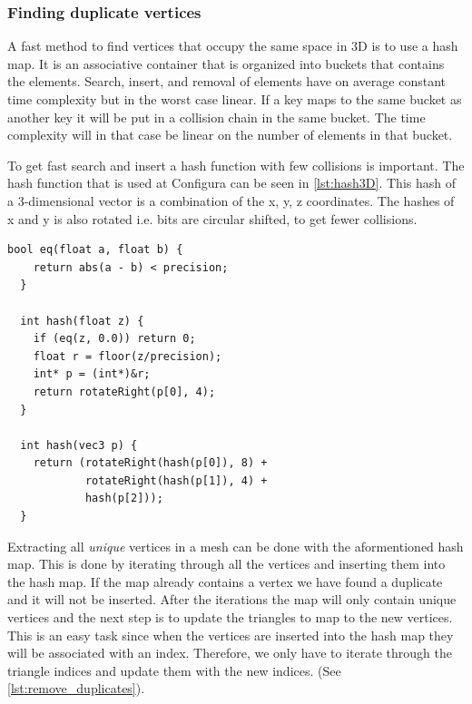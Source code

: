 \begin{subs}
\subsubsection{Finding duplicate vertices}
A fast method to find vertices that occupy the same space in 3D is to use a hash map. It is an associative container that is organized into buckets that contains the elements. Search, insert, and removal of elements have on average constant time complexity but in the worst case linear. If a key maps to the same bucket as another key it will be put in a collision chain in the same bucket. The time complexity will in that case be linear on the number of elements in that bucket.

To get fast search and insert a hash function with few collisions is important. The hash function that is used at Configura can be seen in \cref{lst:hash3D}. This hash of a 3-dimensional vector is a combination of the x, y, z coordinates. The hashes of x and y is also rotated i.e. bits are circular shifted, to get fewer collisions. 

\begin{minipage}{\textwidth}
\begin{lstlisting}[caption={Hashing 3D point}, label={lst:hash3D}]
  bool eq(float a, float b) {
    return abs(a - b) < precision;
  }
  
  int hash(float z) {
    if (eq(z, 0.0)) return 0;
    float r = floor(z/precision);
    int* p = (int*)&r;
    return rotateRight(p[0], 4);
  }
  
  int hash(vec3 p) {
    return (rotateRight(hash(p[0]), 8) +
            rotateRight(hash(p[1]), 4) +
            hash(p[2]));
  }
\end{lstlisting}
\end{minipage}

Extracting all \emph{unique} vertices in a mesh can be done with the aformentioned hash map. This is done by iterating through all the vertices and inserting them into the hash map. If the map already contains a vertex we have found a duplicate and it will not be inserted. After the iterations the map will only contain unique vertices and the next step is to update the triangles to map to the new vertices. This is an easy task since when the vertices are inserted into the hash map they will be associated with an index. Therefore, we only have to iterate through the triangle indices and update them with the new indices. (See \cref{lst:remove_duplicates}).


\end{subs}
